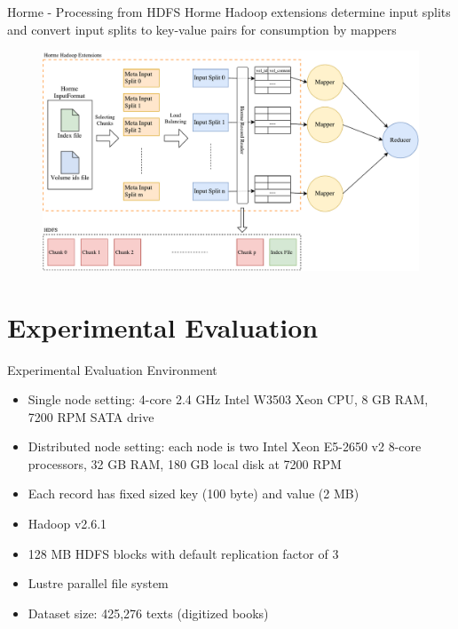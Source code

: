\documentclass[newPxFont]{beamer}
\begin{document}
\begin{frame}[c]{Horme - Processing from HDFS}
  Horme Hadoop extensions determine input splits and convert input splits to key-value pairs for consumption by mappers
  \begin{figure}[t]
  \includegraphics[scale=0.3]{horme-hdfs}
  \centering
\end{figure}
\end{frame}

\section{Experimental Evaluation}

\begin{frame}[c]{Experimental Evaluation Environment}

\begin{itemize}
  \item Single node setting: 4-core 2.4 GHz Intel W3503 Xeon CPU, 8 GB RAM, 7200 RPM SATA drive 
    \item Distributed node setting: each node is two Intel Xeon E5-2650 v2 8-core processors, 32 GB RAM, 180 GB local disk at 7200 RPM 
  \item Each record has fixed sized key (100 byte) and value (2 MB)
  \item Hadoop v2.6.1
  \item 128 MB HDFS blocks with default replication factor of 3
  \item Lustre parallel file system
  \item Dataset size: 425,276 texts (digitized books)
\end{itemize}
\end{frame}
\end{document}
